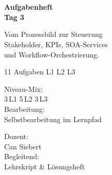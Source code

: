 \documentclass[11pt,a4paper,oneside]{article}
\begin{document}
\begin{titlepage}
  \pagestyle{empty}
  \vspace*{1.5cm}
  \\[2pt]
  \noindent{\color{lpAccent}\rule{\linewidth}{1.2pt}}\\[4pt]

  \vspace{3cm}
  {\sffamily\fontsize{30}{34}\selectfont\bfseries\color{lpInk}Aufgabenheft\\Tag 3\par}

  \vspace{0.7cm}
  {\sffamily\large\color{lpGray}Vom Prozessbild zur Steuerung \textendash{}\\Stakeholder, KPIs, SOA-Services\\und Workflow-Orchestrierung.\par}

  \vspace{1.5cm}
  {\caveatfont\LARGE\color{lpAmber}11 Aufgaben \textperiodcentered{} L1 \textperiodcentered{} L2 \textperiodcentered{} L3}\par

  \vfill

  \noindent\begin{minipage}{0.55\linewidth}
    {\sffamily\footnotesize\color{lpGray}Niveau-Mix:}\\
    {\sffamily\small\color{lpInk}3\,\textsf{L1} \textperiodcentered{} 5\,\textsf{L2} \textperiodcentered{} 3\,\textsf{L3}}\\[10pt]
    {\sffamily\footnotesize\color{lpGray}Bearbeitung:}\\
    {\sffamily\small\color{lpInk}Selbstbearbeitung im Lernpfad}
  \end{minipage}\hfill
  \begin{minipage}{0.4\linewidth}
    \raggedleft
    {\sffamily\footnotesize\color{lpGray}Dozent:}\\
    {\sffamily\small\color{lpInk}Can Siebert}\\[10pt]
    {\sffamily\footnotesize\color{lpGray}Begleitend:}\\
    {\sffamily\small\color{lpInk}Lehrskript \& L\"osungsheft}
  \end{minipage}

  \vspace{0.5cm}
  \noindent{\color{lpAccent}\rule{\linewidth}{0.6pt}}
\end{titlepage}
\end{document}
